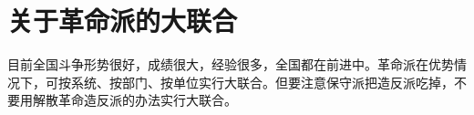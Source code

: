 \section[关于革命派的大联合（一九六七年四月）]{关于革命派的大联合}


目前全国斗争形势很好，成绩很大，经验很多，全国都在前进中。革命派在优势情况下，可按系统、按部门、按单位实行大联合。但要注意保守派把造反派吃掉，不要用解散革命造反派的办法实行大联合。

